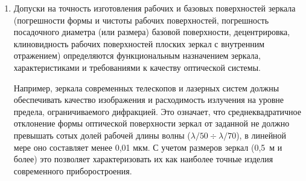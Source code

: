 \begin{enumerate}[leftmargin=*]
Сферические и асферические зеркала (параболические, гиперболические, эллиптические), осевые и вне осевые обычно имеют круглую форму. Часто такие зеркала имеют внутреннее отверстие для прохождения пучка лучей, базирования зеркала или закрепления в нем других элементов (например, бленды).

Зеркала могут быть изготовлены также в виде бипризм, пирамид, конусов и полигонов (рис.~\ref{pic:6planmirror}), которые используются для разделения пучка лучей, сканирования изображения, модуляции светового потока, как эталоны углов.

Особую конструкцию имеют составные и гибкие (адаптивные) зеркала, формой рабочих поверхностей которых управляют для компенсации влияния рефракций и турбулентности атмосферы, погрешностей оптической системы и ее юстировки (рис.~\ref{pic:6adaptmirror}).

\begin{figure}[h!]
	\texttt{[image: 6planmirror.png]}
	\label{pic:6planmirror}
\end{figure}

\begin{figure}[h!]
	\texttt{[image: 6adaptmirror.png]}
	\label{pic:6adaptmirror}
\end{figure}

\item Допуски на точность изготовления рабочих и базовых поверхностей зеркала (погрешности формы и чистоты рабочих поверхностей, погрешность посадочного диаметра (или размера) базовой поверхности, децентрировка, клиновидность рабочих поверхностей плоских зеркал с внутренним отражением) определяются  функциональным  назначением зеркала, характеристиками и требованиями к качеству оптической системы.

Например, зеркала современных телескопов и лазерных систем должны обеспечивать качество изображения и расходимость излучения на уровне предела, ограничиваемого дифракцией. Это означает, что среднеквадратичное отклонение формы оптической поверхности зеркал от заданной не должно превышать сотых долей рабочей длины волны ($ \lambda/50 \div \lambda/70 $), в линейной мере оно составляет менее 0,01 мкм. С учетом размеров зеркал (0,5~м и более) это позволяет характеризовать их как наиболее точные изделия современного приборостроения.


\end{enumerate}
